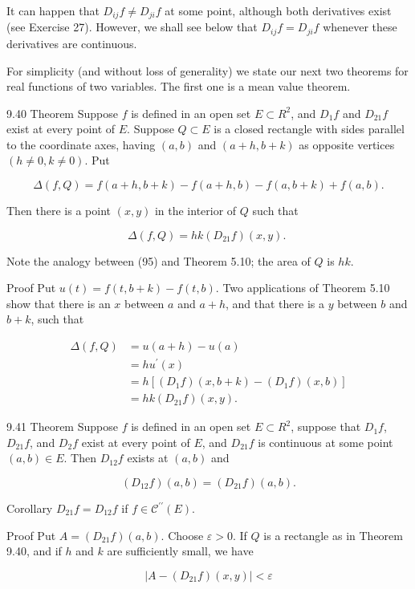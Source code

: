 \documentclass[10pt]{article}
\begin{document}
It can happen that $D_{i j} f \neq D_{j i} f$ at some point, although both derivatives exist (see Exercise 27). However, we shall see below that $D_{i j} f=D_{j i} f$ whenever these derivatives are continuous.

For simplicity (and without loss of generality) we state our next two theorems for real functions of two variables. The first one is a mean value theorem.

9.40 Theorem Suppose $f$ is defined in an open set $E \subset R^{2}$, and $D_{1} f$ and $D_{21} f$ exist at every point of $E$. Suppose $Q \subset E$ is a closed rectangle with sides parallel to the coordinate axes, having $(a, b)$ and $(a+h, b+k)$ as opposite vertices $(h \neq 0, k \neq 0)$. Put

$$
\Delta(f, Q)=f(a+h, b+k)-f(a+h, b)-f(a, b+k)+f(a, b) .
$$

Then there is a point $(x, y)$ in the interior of $Q$ such that

$$
\Delta(f, Q)=h k\left(D_{21} f\right)(x, y) \text {. }
$$

Note the analogy between (95) and Theorem 5.10; the area of $Q$ is $h k$.

Proof Put $u(t)=f(t, b+k)-f(t, b)$. Two applications of Theorem 5.10 show that there is an $x$ between $a$ and $a+h$, and that there is a $y$ between $b$ and $b+k$, such that

$$
\begin{aligned}
\Delta(f, Q) & =u(a+h)-u(a) \\
& =h u^{\prime}(x) \\
& =h\left[\left(D_{1} f\right)(x, b+k)-\left(D_{1} f\right)(x, b)\right] \\
& =h k\left(D_{21} f\right)(x, y) .
\end{aligned}
$$

9.41 Theorem Suppose $f$ is defined in an open set $E \subset R^{2}$, suppose that $D_{1} f$, $D_{21} f$, and $D_{2} f$ exist at every point of $E$, and $D_{21} f$ is continuous at some point $(a, b) \in E$. Then $D_{12} f$ exists at $(a, b)$ and

$$
\left(D_{12} f\right)(a, b)=\left(D_{21} f\right)(a, b) .
$$

Corollary $D_{21} f=D_{12} f$ if $f \in \mathscr{C}^{\prime \prime}(E)$.

Proof Put $A=\left(D_{21} f\right)(a, b)$. Choose $\varepsilon>0$. If $Q$ is a rectangle as in Theorem 9.40, and if $h$ and $k$ are sufficiently small, we have

$$
\left|A-\left(D_{21} f\right)(x, y)\right|<\varepsilon
$$
\end{document}
